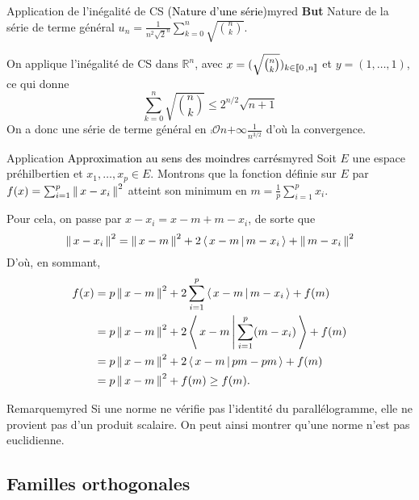         \begin{omed}{Application de l’inégalité de CS \textcolor{black}{(Nature d’une série)}}{myred}
            \textbf{But} \quad Nature de la série de terme général $u_n = \frac{1}{n^2 \sqrt{2}^n} \sum_{k=0}^{n} \sqrt{\binom{n}{k}}$.

            On applique l’inégalité de CS dans $\mathbb{R}^n$, avec $x = (\sqrt{\binom{n}{k}})_{k \in \left\llbracket 0 \, , n \right\rrbracket}$ et $y = (1,\ldots,1)$, ce qui donne 
            \[ \sum_{k=0}^{n} \sqrt{\binom{n}{k}} \leq 2^{n/2} \sqrt{n+1} \]   
            On a donc une série de terme général en $\comp{\mathcal{O}}{n}{+\infty}{\frac{1}{n^{3/2}}}$ d’où la convergence.
        \end{omed}

        \begin{omed}{Application \textcolor{black}{Approximation au sens des moindres carrés}}{myred}
            Soit $E$ une espace préhilbertien et $x_1,\ldots,x_p \in E$. Montrons que la fonction définie sur $E$ par $f(x) = \sum_{i=1}^{p} \left\lVert \,x-x_i \, \right\rVert^2$ atteint son minimum en $m = \frac{1}{p} \sum_{i=1}^{p} x_i$.

            Pour cela, on passe par $x - x_i = x - m + m - x_i$, de sorte que 
            \[ \left\lVert \,x - x_i \, \right\rVert^2 = \left\lVert \,x - m \, \right\rVert^2 + 2 \left<\,x-m\,\middle|\,m - x_i\,\right> + \left\lVert \,m - x_i \, \right\rVert^2 \]    
            D’où, en sommant, 
            \begin{align*}
                f(x)
                &=p\left\lVert \,x- m \, \right\rVert^2+ 2\sum_{i=1}^p \left<\,x - m\,\middle|\,m - x_i\,\right>+f(m)\\
                &=p\left\lVert \,x- m \, \right\rVert^2+2  \left<\,x - m\,\middle|\,\sum_{i=1}^{p} (m-x_i)\,\right>+f(m)\\
                &=p\left\lVert \,x- m \, \right\rVert^2+2 \left<\,x- m\,\middle|\,pm - pm\,\right>  +f (m)\\
                &=p\left\lVert \,x- m \, \right\rVert^2+f(m)\geq f(m).
            \end{align*}
        \end{omed}

        \begin{omed}{Remarque}{myred}
            Si une norme ne vérifie pas l’identité du parallélogramme, elle ne provient pas d’un produit scalaire. On peut ainsi montrer qu’une norme n’est pas euclidienne.
        \end{omed}

    \subsection{Familles orthogonales}

